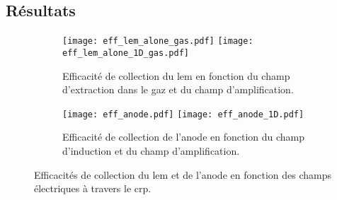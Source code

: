             
    \subsection{Résultats}

      \begin{figure}[htpb]
        \begin{subfigure}{\textwidth}
          \centering
          \texttt{[image: eff\_lem\_alone\_gas.pdf]}\hfill
          \texttt{[image: eff\_lem\_alone\_1D\_gas.pdf]}
          \caption{\label{fig::eff_lem_alone}Efficacité de collection du \gls{lem} en fonction du champ d'extraction dans le gaz et du champ d'amplification.}
        \end{subfigure}\hfill
        \begin{subfigure}{\textwidth}
          \centering
          \texttt{[image: eff\_anode.pdf]}\hfill
          \texttt{[image: eff\_anode\_1D.pdf]}
          \caption{\label{fig::eff_anode}Efficacité de collection de l'anode en fonction du champ d'induction et du champ d'amplification.}
        \end{subfigure}
        \caption[Efficacités de collection du LEM et de l'anode en fonction des champs électriques à travers le CRP]{\label{fig::eff_coll}Efficacités de collection du \gls{lem} et de l'anode en fonction des champs électriques à travers le \gls{crp}.}
      \end{figure}

